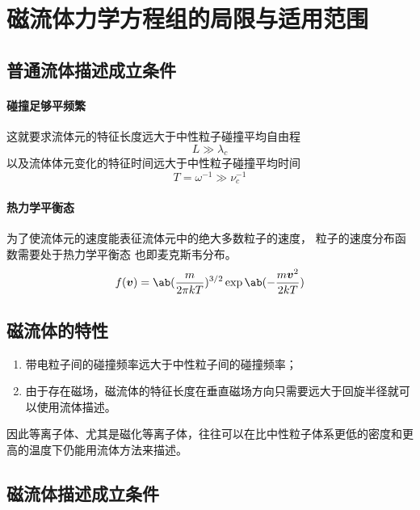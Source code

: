 \section{磁流体力学方程组的局限与适用范围}

\subsection{普通流体描述成立条件}

\paragraph{碰撞足够平频繁}
这就要求流体元的特征长度远大于中性粒子碰撞平均自由程
\begin{equation}
L \gg \lambda_c
\end{equation}
以及流体体元变化的特征时间远大于中性粒子碰撞平均时间
\begin{equation}
T = \omega^{-1} \gg \nu_c^{-1}
\end{equation}

\paragraph{热力学平衡态}
为了使流体元的速度能表征流体元中的绝大多数粒子的速度，
粒子的速度分布函数需要处于热力学平衡态 也即麦克斯韦分布。
\begin{equation}
f(\vec{v}) = \ab(\frac{m}{2 \pi k T})^{3/2}
\exp{\ab(-\frac{m \vec{v}^2}{2 k T})}
\end{equation}

\subsection{磁流体的特性}

\begin{enumerate}
    \item 带电粒子间的碰撞频率远大于中性粒子间的碰撞频率；
    \item 由于存在磁场，磁流体的特征长度在垂直磁场方向只需要远大于回旋半径就可以使用流体描述。
\end{enumerate}

因此等离子体、尤其是磁化等离子体，往往可以在比中性粒子体系更低的密度和更高的温度下仍能用流体方法来描述。

\subsection{磁流体描述成立条件}

